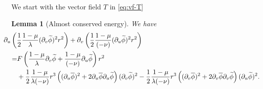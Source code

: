 \documentclass[10pt, reqno]{amsart}
\newtheorem{lemma}[theorem]{Lemma}
\theoremstyle{definition}
\theoremstyle{remark}
\theoremstyle{conjecture}
\numberwithin{equation}{section}
\newcommand{\rd}{\partial}
\newcommand{\0}{\emptyset}
\newcommand{\lmb}{\lambda}
\newcommand{\dur}{\nu}
\newcommand{\dvr}{\lmb}
\newcommand{\phibg}{\overline{\phi}}				%
\newcommand{\phidf}{\widetilde{\phi}}				%
\begin{document}
We start with the vector field $T$ in \eqref{eq:vf-T}
\begin{lemma} [Almost conserved energy] \label{lem:consv-en}
We have 
\begin{equation} \label{eq:en-id-T}
\begin{aligned}
&\hskip-2em
	\rd_{u} \left( \frac{1}{2} \frac{1-\mu}{\dvr} (\rd_{v} \phidf)^{2} r^{2}\right) 
	+ \rd_{v} \left( \frac{1}{2} \frac{1-\mu}{(-\dur)} (\rd_{u} \phidf)^{2} r^{2} \right)   \\
= & F \left( \frac{1-\mu}{\dvr} \rd_{v} \phidf + \frac{1-\mu}{(-\dur)} \rd_{u} \phidf \right) r^{2} \\
	& + \frac{1}{2}  \frac{1-\mu}{\dvr (-\dur)}  r^{3} \left( (\rd_{u} \phibg)^{2} + 2 \rd_{u} \phibg \rd_{u} \phidf \right) (\rd_{v} \phidf)^{2} 
	 - \frac{1}{2} \frac{1-\mu}{\dvr (-\dur)}  r^{3} \left( (\rd_{v} \phibg)^{2} + 2 \rd_{v} \phibg \rd_{v} \phidf \right)  (\rd_{u} \phidf)^{2} .
\end{aligned}
\end{equation}
\end{lemma}
\end{document}
